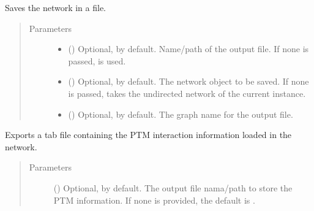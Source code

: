 \documentclass[letterpaper,10pt,english]{sphinxmanual}
\begin{document}
\begin{fulllineitems}
\begin{fulllineitems}
\label{\detokenize{main:pypath.main.PyPath.export_graphml}}
Saves the network in a  file.
\begin{quote}\begin{description}
\item[{Parameters}] \leavevmode\begin{itemize}
\item {} 
 () \textendash{} Optional,  by default. Name/path of the output file.
If none is passed,
 is used.

\item {} 
 () \textendash{} Optional,  by default. The network object to be
saved. If none is passed, takes the undirected network of
the current instance.

\item {} 
 () \textendash{} Optional,  by default. The graph name for the
output file.

\end{itemize}

\end{description}\end{quote}

\end{fulllineitems}


\begin{fulllineitems}
\label{\detokenize{main:pypath.main.PyPath.export_ptms_tab}}
Exports a tab file containing the PTM interaction information
loaded in the network.
\begin{quote}\begin{description}
\item[{Parameters}] \leavevmode
{} () \textendash{} Optional,  by default. The output file nama/path to
store the PTM information. If none is provided, the default
is .


\end{description}
\end{quote}
\end{fulllineitems}
\end{fulllineitems}
\end{document}
